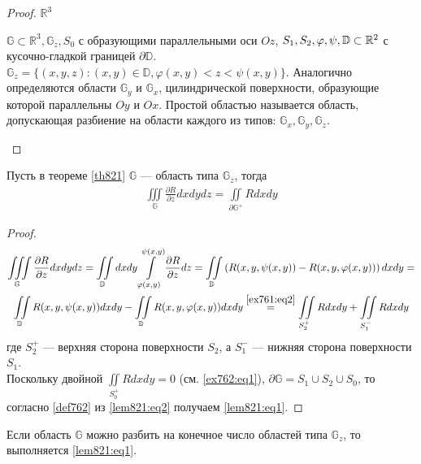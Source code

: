 \begin{proof}
  $\mathbb{R}^3$
  \begin{definition}
    $\mathbb{G} \subset \mathbb{R}^3, \mathbb{G}_z, S_0$ с образующими
    параллельными оси $Oz$, $S_1, S_2, \varphi, \psi, \\ \mathbb{D} \subset
    \mathbb{R}^2$ с кусочно-гладкой границей $\partial \mathbb{D}$.
    $\mathbb{G}_z = \{(x, y, z) : (x, y) \in \mathbb{D}, \varphi(x, y) < z <
    \psi(x, y)\}$. Аналогично определяются области $\mathbb{G}_y$ и
    $\mathbb{G}_x$, цилиндрической поверхности, образующие которой параллельны
    $Oy$ и $Ox$. Простой областью называется область, допускающая разбиение на
    области каждого из типов: $\mathbb{G}_x, \mathbb{G}_y, \mathbb{G}_z$.
  \end{definition}
\end{proof}

\begin{lemma}
  Пусть в теореме \eqref{th821} $\mathbb{G}$ --- область типа $\mathbb{G}_z$,
  тогда
  \begin{gather}
    \iiint\limits_{\mathbb{G}} \frac{\partial R}{\partial z} dx dy dz =
    \iint\limits_{\partial \mathbb{G}^+} R dx dy
    \label{lem821:eq1}
  \end{gather}
\end{lemma}

\begin{proof}
  \begin{gather}
    \iiint\limits_{\mathbb{G}} \frac{\partial R}{\partial z} dx dy dz =
    \iint\limits_{\mathbb{D}} dx dy \int\limits_{\varphi(x, y)}^{\psi(x, y)}
    \frac{\partial R}{\partial z} dz = \iint\limits_{\mathbb{D}} \left(R(x, y,
    \psi(x, y)) - R(x, y, \varphi(x, y)) \right) dx dy = \nonumber \\
    \iint\limits_{\mathbb{D}} R(x, y, \psi(x, y)) dx dy -
    \iint\limits_{\mathbb{D}} R(x, y, \varphi(x, y)) dx dy
    \overset{\eqref{ex761:eq2}} = \iint\limits_{S_2^+} R dx dy +
    \iint\limits_{S_1^-} R dx dy
    \label{lem821:eq2}
  \end{gather}
  где $S_2^+$ --- верхняя сторона поверхности $S_2$, а $S_1^-$ --- нижняя
  сторона поверхности $S_1$. \\ Поскольку двойной $\iint\limits_{S_0^+} R dx dy =
  0$ (см. \eqref{ex762:eq1}), $\partial \mathbb{G} = S_1 \cup S_2 \cup S_0$, то
  согласно \eqref{def762} из \eqref{lem821:eq2} получаем \eqref{lem821:eq1}.
\end{proof}

\begin{lemma}
  Если область $\mathbb{G}$ можно разбить на конечное число областей типа
  $\mathbb{G}_z$, то выполняется \eqref{lem821:eq1}.
\end{lemma}

